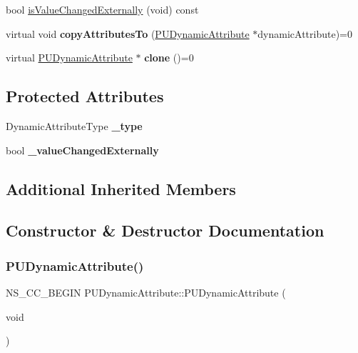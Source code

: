 \begin{DoxyCompactItemize}
\item 
bool \hyperlink{classPUDynamicAttribute_adcf769af69d3508302426d751646425f}{is\+Value\+Changed\+Externally} (void) const
\item 
\mbox{\label{classPUDynamicAttribute_a57729a2c17d0c3444e4160e6eedc1605}} 
virtual void {\bfseries copy\+Attributes\+To} (\hyperlink{classPUDynamicAttribute}{P\+U\+Dynamic\+Attribute} $\ast$dynamic\+Attribute)=0
\item 
\mbox{\label{classPUDynamicAttribute_ab387d4adcb71e7f9a216031cb2857744}} 
virtual \hyperlink{classPUDynamicAttribute}{P\+U\+Dynamic\+Attribute} $\ast$ {\bfseries clone} ()=0
\end{DoxyCompactItemize}
\subsection*{Protected Attributes}
\begin{DoxyCompactItemize}
\item 
\mbox{\label{classPUDynamicAttribute_aad6c3806393b15975901ef4580ca8816}} 
Dynamic\+Attribute\+Type {\bfseries \+\_\+type}
\item 
\mbox{\label{classPUDynamicAttribute_a4992b5b6397eab7b22c3df97ace927d8}} 
bool {\bfseries \+\_\+value\+Changed\+Externally}
\end{DoxyCompactItemize}
\subsection*{Additional Inherited Members}


\subsection{Constructor \& Destructor Documentation}
\mbox{\label{classPUDynamicAttribute_aec733973af85ac7b0f3076ba6d51491a}} 
\subsubsection{\texorpdfstring{P\+U\+Dynamic\+Attribute()}{PUDynamicAttribute()}\hspace{0.1cm}{\footnotesize\ttfamily [1/2]}}
{\footnotesize\ttfamily N\+S\+\_\+\+C\+C\+\_\+\+B\+E\+G\+IN P\+U\+Dynamic\+Attribute\+::\+P\+U\+Dynamic\+Attribute (\begin{DoxyParamCaption}\item[{void}]{ }\end{DoxyParamCaption})}


